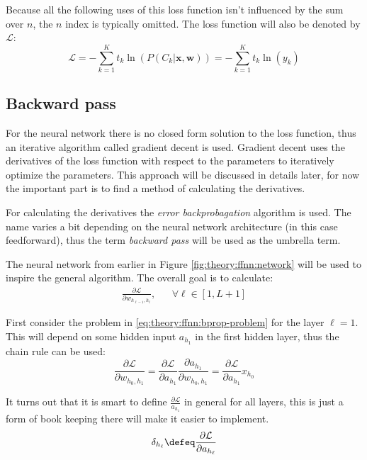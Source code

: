 Because all the following uses of this loss function isn't influenced by the sum over $n$, the $n$ index is typically omitted. The loss function will also be denoted by $\mathcal{L}$:
\begin{equation}
\mathcal{L} = - \sum_{k=1}^K t_{k} \ln\left( P(C_{k} | \mathbf{x}, \mathbf{w})\right) =  - \sum_{k=1}^K t_k \ln(y_k)
\label{eq:theory:ffnn:loss}
\end{equation}

\subsection{Backward pass}

For the neural network there is no closed form solution to the loss function, thus an iterative algorithm called gradient decent is used. Gradient decent uses the derivatives of the loss function with respect to the parameters to iteratively optimize the parameters. This approach will be discussed in details later, for now the important part is to find a method of calculating the derivatives.

For calculating the derivatives the \textit{error backprobagation} algorithm is used. The name varies a bit depending on the neural network architecture (in this case feedforward), thus the term \textit{backward pass} will be used as the umbrella term.

The neural network from earlier in Figure \ref{fig:theory:ffnn:network} will be used to inspire the general algorithm. The overall goal is to calculate:
\begin{equation}
\begin{aligned}
\frac{\partial \mathcal{L}}{\partial w_{h_{\ell-1}, h_\ell}}, && \forall \ell \in [1, L + 1]
\end{aligned}
\label{eq:theory:ffnn:bprop-problem}
\end{equation} 

First consider the problem in \eqref{eq:theory:ffnn:bprop-problem} for the layer $\ell = 1$. This will depend on some hidden input $a_{h_1}$ in the first hidden layer, thus the chain rule can be used:
\begin{equation}
\frac{\partial \mathcal{L}}{\partial w_{h_0, h_1}} = \frac{\partial \mathcal{L}}{\partial a_{h_1}} \frac{\partial a_{h_1}}{\partial w_{h_0, h_1}} =  \frac{\partial \mathcal{L}}{\partial a_{h_1}} x_{h_0}
\label{eq:theory:ffnn:bprop-firstlayer}
\end{equation}

It turns out that it is smart to define $\frac{\partial \mathcal{L}}{a_{h_1}}$ in general for all layers, this is just a form of book keeping there will make it easier to implement.
\begin{equation}
\delta_{h_\ell} \defeq \frac{\partial \mathcal{L}}{\partial a_{h_\ell}}
\end{equation}

